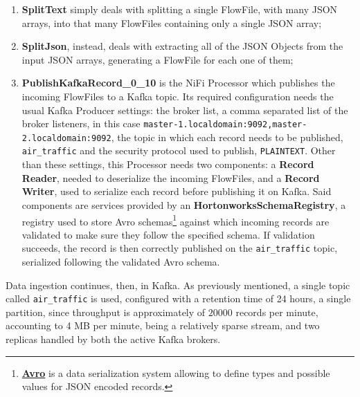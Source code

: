 \begin{enumerate}
\item \textbf{SplitText} simply deals with splitting a single FlowFile, with many JSON arrays, into that many FlowFiles containing only a single JSON array;
\item \textbf{SplitJson}, instead, deals with extracting all of the JSON Objects from the input JSON arrays, generating a FlowFile for each one of them;
\item \textbf{PublishKafkaRecord\_0\_10} is the NiFi Processor which publishes the incoming FlowFiles to a Kafka topic. Its required configuration needs the usual Kafka Producer settings: the broker list, a comma separated list of the broker listeners, in this case \texttt{master-1.localdomain:9092,master-2.localdomain:9092}, the topic in which each record needs to be published, \texttt{air\_traffic} and the security protocol used to publish, \texttt{PLAINTEXT}. Other than these settings, this Processor needs two components: a \textbf{Record Reader}, needed to deserialize the incoming FlowFiles, and a \textbf{Record Writer}, used to serialize each record before publishing it on Kafka. Said components are services provided by an \textbf{HortonworksSchemaRegistry}, a registry used to store Avro schemas\footnote{\textbf{\href{https://avro.apache.org/}{Avro}} is a data serialization system allowing to define types and possible values for JSON encoded records.} against which incoming records are validated to make sure they follow the specified schema. If validation succeeds, the record is then correctly published on the \texttt{air\_traffic} topic, serialized following the validated Avro schema.
\end{enumerate}

Data ingestion continues, then, in Kafka. As previously mentioned, a single topic called \texttt{air\_traffic} is used, configured with a retention time of 24 hours, a single partition, since throughput is approximately of $20000$ records per minute, accounting to 4 MB per minute, being a relatively sparse stream, and two replicas handled by both the active Kafka brokers.
\pagebreak